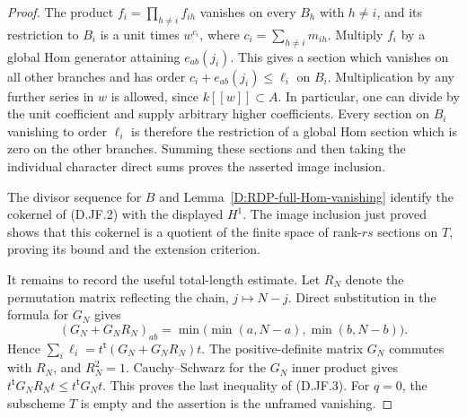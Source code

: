 \begin{proof}
The product $f_i=\prod_{h\ne i}f_{ih}$ vanishes on every
$B_h$ with $h\ne i$, and its restriction to $B_i$ is a unit
times $w^{c_i}$, where $c_i=\sum_{h\ne i}m_{ih}$.
Multiply $f_i$ by a global Hom generator attaining
$e_{ab}(j_i)$.  This gives a section which vanishes on all
other branches and has order $c_i+e_{ab}(j_i)\le\ell_i$
on $B_i$.  Multiplication by any further series in $w$ is
allowed, since $k[[w]]\subset A$.  In particular, one can
divide by the unit coefficient and supply arbitrary higher
coefficients.  Every section on $B_i$ vanishing to order
$\ell_i$ is therefore the restriction of a global Hom
section which is zero on the other branches.
Summing these sections and then taking the individual character
direct sums proves the asserted image inclusion.

The divisor sequence for $B$ and
Lemma~\ref{D:RDP-full-Hom-vanishing} identify the cokernel of
(D.JF.2) with the displayed $H^1$.  The image inclusion just
proved shows that this cokernel is a quotient of the finite
space of rank-$rs$ sections on $T$, proving its bound and
the extension criterion.

It remains to record the useful total-length estimate.
Let $R_N$ denote the permutation matrix reflecting the chain,
$j\mapsto N-j$.  Direct substitution in the formula for $G_N$
gives
\[
 (G_N+G_NR_N)_{ab}
      =\min\bigl(\min(a,N-a),\min(b,N-b)\bigr).
                                                        \tag{D.JF.9}
\]
Hence $\sum_i\ell_i=t^{\mathsf t}(G_N+G_NR_N)t$.
The positive-definite matrix $G_N$ commutes with $R_N$,
and $R_N^2=1$.  Cauchy--Schwarz for the $G_N$ inner product
gives
$t^{\mathsf t}G_NR_Nt\le t^{\mathsf t}G_Nt$.
This proves the last inequality of (D.JF.3).
For $q=0$, the subscheme $T$ is empty and the assertion is
the unframed vanishing.
\end{proof}

